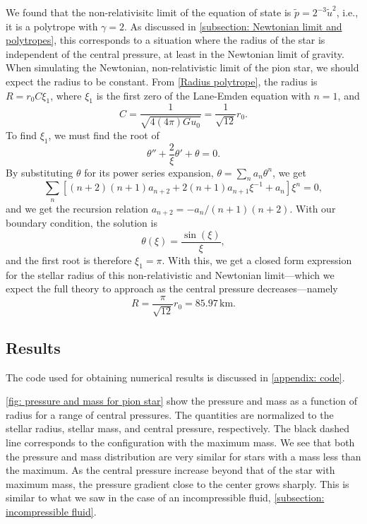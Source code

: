 We found that the non-relativisitc limit of the equation of state is $\tilde p = 2^{-3} \tilde u^2$, i.e., it is a polytrope with $\gamma = 2$.
As discussed in \autoref{subsection: Newtonian limit and polytropes}, this corresponds to a situation where the radius of the star is independent of the central pressure, at least in the Newtonian limit of gravity.
When simulating the Newtonian, non-relativistic limit of the pion star, we should expect the radius to be constant.
From \autoref{Radius polytrope}, the radius is $R = r_0 C \xi_1$, where $\xi_1$ is the first zero of the Lane-Emden equation with $n = 1$, and
%
\begin{equation}
    C = \frac{1}{\sqrt{4(4\pi ) G u_0}} = \frac{1}{\sqrt{12}}r_0.
\end{equation}
%
To find $\xi_1$, we must find the root of
%
\begin{equation}
    \theta'' + \frac{2}{\xi} \theta' + \theta = 0.
\end{equation}
%
By substituting $\theta$ for its power series expansion, $\theta = \sum_n a_n \theta^n$, we get
%
\begin{equation}
    \sum_n \left[ (n+2)(n+1) a_{n+2} + 2(n+1) a_{n+1} \xi^{-1} + a_n \right] \xi^n = 0,
\end{equation}
%
and we get the recursion relation $a_{n+2} = - a_n / (n+1)(n+2)$.
With our boundary condition, the solution is
%
\begin{equation}
    \theta(\xi) = \frac{\sin(\xi)}{\xi},
\end{equation}
%
and the first root is therefore $\xi_1 = \pi$.
With this, we get a closed form expression for the stellar radius of this non-relativistic and Newtonian limit---which we expect the full theory to approach as the central pressure decreases---namely
%
\begin{equation}
    \label{radius pion star nr limit}
    R = \frac{\pi}{\sqrt{12}} r_0 = 85.97 \, \text{km}.
\end{equation}


\subsection{Results}

The code used for obtaining numerical results is discussed in \autoref{appendix: code}.

\autoref{fig: pressure and mass for pion star} show the pressure and mass as a function of radius for a range of central pressures.
The quantities are normalized to the stellar radius, stellar mass, and central pressure, respectively.
The black dashed line corresponds to the configuration with the maximum mass.
We see that both the pressure and mass distribution are very similar for stars with a mass less than the maximum.
As the central pressure increase beyond that of the star with maximum mass, the pressure gradient close to the center grows sharply.
This is similar to what we saw in the case of an incompressible fluid, \autoref{subsection: incompressible fluid}.


